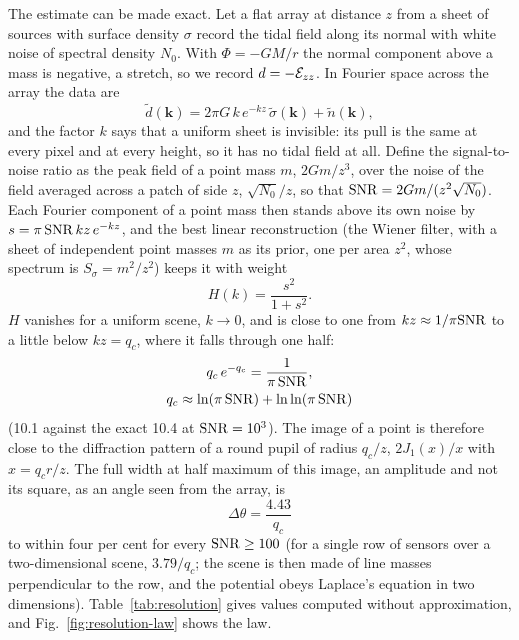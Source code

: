 The estimate can be made exact. Let a flat array at distance $z$ from a sheet
of sources with surface density $\sigma$ record the tidal field along its
normal with white noise of spectral density $N_0$. With $\Phi = -GM/r$ the
normal component above a mass is negative, a stretch, so we record
$d = -\mathcal{E}_{zz}$. In Fourier space across the array the data are
\begin{equation}\label{eq:array-data}
\tilde d(\mathbf k) = 2\pi G\,k\,e^{-kz}\,\tilde\sigma(\mathbf k) + \tilde n(\mathbf k),
\end{equation}
and the factor $k$ says that a uniform sheet is invisible: its pull is the
same at every pixel and at every height, so it has no tidal field at all.
Define the signal-to-noise ratio as the peak field of a
point mass $m$, $2Gm/z^3$, over the noise of the field averaged across a patch
of side $z$, $\sqrt{N_0}/z$, so that $\mathrm{SNR} = 2Gm/(z^2\sqrt{N_0})$. Each Fourier
component of a point mass then stands above its own noise by
$s = \pi\,\mathrm{SNR}\,kz\,e^{-kz}$, and the best linear reconstruction (the Wiener
filter, with a sheet of independent point masses $m$ as its prior, one per area
$z^2$, whose spectrum is $S_\sigma = m^2/z^2$) keeps it with weight
\begin{equation}\label{eq:wiener}
H(k) = \frac{s^2}{1 + s^2}.
\end{equation}
$H$ vanishes for a uniform scene, $k \to 0$, and is close to one from
$kz \approx 1/\pi\mathrm{SNR}$ to a little below $kz = q_c$, where it falls through
one half:
\begin{equation}\label{eq:cutoff}
\begin{gathered}
q_c\,e^{-q_c} = \frac{1}{\pi\,\mathrm{SNR}},\\
q_c \approx \ln(\pi\,\mathrm{SNR}) + \ln\ln(\pi\,\mathrm{SNR})
\end{gathered}
\end{equation}
(10.1 against the exact 10.4 at $\mathrm{SNR} = 10^3$).
The image of a point is therefore close to the diffraction pattern of a round
pupil of radius $q_c/z$, $2J_1(x)/x$ with $x = q_c r/z$. The full width at half
maximum of this image, an amplitude and not its square, as an angle seen from
the array, is
\begin{equation}\label{eq:resolution}
\Delta\theta = \frac{4.43}{q_c}
\end{equation}
to within four per cent for every $\mathrm{SNR} \ge 100$ (for a single row of
sensors over a two-dimensional scene, $3.79/q_c$; the scene is then made of
line masses perpendicular to the row, and the potential obeys Laplace's
equation in two dimensions). Table~\ref{tab:resolution}
gives values computed without approximation, and
Fig.~\ref{fig:resolution-law} shows the law.

